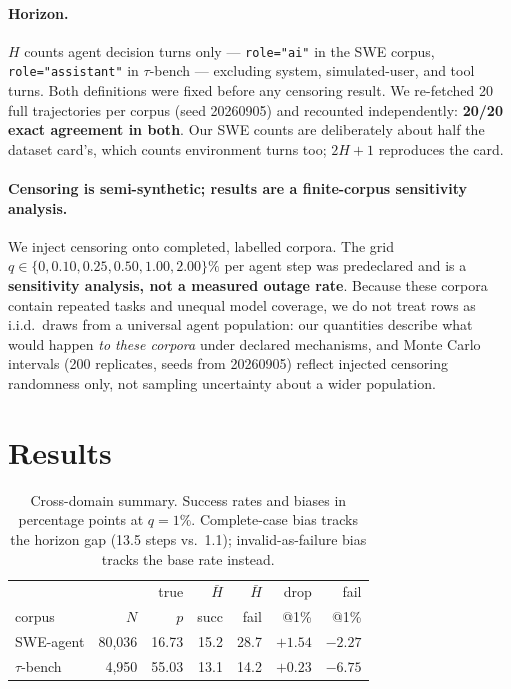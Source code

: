 \documentclass[letterpaper]{article}
\begin{document}
\paragraph{Horizon.} $H$ counts agent decision turns only --- \texttt{role="ai"}
in the SWE corpus, \texttt{role="assistant"} in $\tau$-bench --- excluding
system, simulated-user, and tool turns. Both definitions were fixed before any
censoring result. We re-fetched 20 full trajectories per corpus (seed 20260905)
and recounted independently: \textbf{20/20 exact agreement in both}. Our SWE
counts are deliberately about half the dataset card's, which counts environment
turns too; $2H{+}1$ reproduces the card.

\paragraph{Censoring is semi-synthetic; results are a finite-corpus sensitivity
analysis.} We inject censoring onto completed, labelled corpora. The grid
$q\in\{0,0.10,0.25,0.50,1.00,2.00\}\%$ per agent step was predeclared and is a
\textbf{sensitivity analysis, not a measured outage rate}. Because these corpora
contain repeated tasks and unequal model coverage, we do not treat rows as
i.i.d.\ draws from a universal agent population: our quantities describe what
would happen \emph{to these corpora} under declared mechanisms, and Monte Carlo
intervals (200 replicates, seeds from 20260905) reflect injected censoring
randomness only, not sampling uncertainty about a wider population.

\section{Results}
\label{sec:results}

\begin{table}[t]
\centering
\small
\setlength{\tabcolsep}{4pt}
\begin{tabular}{@{}lrrrrrr@{}}
\toprule
& & true & $\bar H$ & $\bar H$ & drop & fail \\
corpus & $N$ & $p$ & succ & fail & @1\% & @1\% \\
\midrule
SWE-agent & 80{,}036 & 16.73 & 15.2 & 28.7 & $+1.54$ & $-2.27$ \\
$\tau$-bench & 4{,}950 & 55.03 & 13.1 & 14.2 & $+0.23$ & $-6.75$ \\
\bottomrule
\end{tabular}
\caption{Cross-domain summary. Success rates and biases in percentage points at
$q=1\%$. Complete-case bias tracks the horizon gap (13.5 steps vs.\ 1.1);
invalid-as-failure bias tracks the base rate instead.}
\label{tab:cross}
\end{table}
\end{document}
